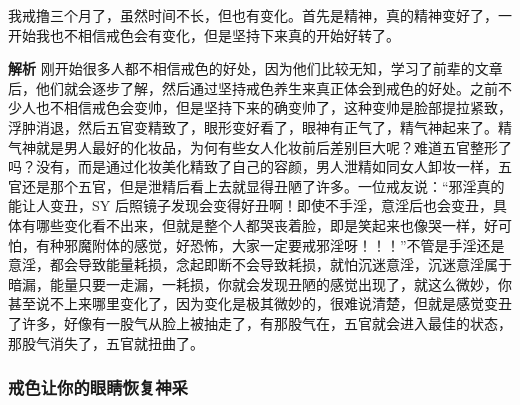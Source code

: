 \begin{case}
    我戒撸三个月了，虽然时间不长，但也有变化。首先是精神，真的精神变好了，一开始我也不相信戒色会有变化，但是坚持下来真的开始好转了。

    \textbf{解析} 刚开始很多人都不相信戒色的好处，因为他们比较无知，学习了前辈的文章后，他们就会逐步了解，然后通过坚持戒色养生来真正体会到戒色的好处。之前不少人也不相信戒色会变帅，但是坚持下来的确变帅了，这种变帅是脸部提拉紧致，浮肿消退，然后五官变精致了，眼形变好看了，眼神有正气了，精气神起来了。精气神就是男人最好的化妆品，为何有些女人化妆前后差别巨大呢？难道五官整形了吗？没有，而是通过化妆美化精致了自己的容颜，男人泄精如同女人卸妆一样，五官还是那个五官，但是泄精后看上去就显得丑陋了许多。一位戒友说：“邪淫真的能让人变丑，SY 后照镜子发现会变得好丑啊！即使不手淫，意淫后也会变丑，具体有哪些变化看不出来，但就是整个人都哭丧着脸，即是笑起来也像哭一样，好可怕，有种邪魔附体的感觉，好恐怖，大家一定要戒邪淫呀！！！”不管是手淫还是意淫，都会导致能量耗损，念起即断不会导致耗损，就怕沉迷意淫，沉迷意淫属于暗漏，能量只要一走漏，一耗损，你就会发现丑陋的感觉出现了，就这么微妙，你甚至说不上来哪里变化了，因为变化是极其微妙的，很难说清楚，但就是感觉变丑了许多，好像有一股气从脸上被抽走了，有那股气在，五官就会进入最佳的状态，那股气消失了，五官就扭曲了。
\end{case}

\subsubsection{戒色让你的眼睛恢复神采}

